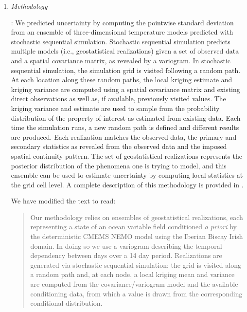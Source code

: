 \documentclass[a4paper]{article}
\begin{document}
\begin{answers}
\begin{enumerate}
\begin{quote}
\end{quote}

\item {\it Methodology}\label{sec:r1-meth}


  \action: We predicted uncertainty by computing the pointwise
  standard deviation from an ensemble of three-dimensional temperature
  models predicted with stochastic sequential simulation. Stochastic
  sequential simulation predicts multiple models (i.e., geostatistical
  realizations) given a set of observed data and a spatial covariance
  matrix, as revealed by a variogram.  In stochastic sequential
  simulation, the simulation grid is visited following a random
  path. At each location along these random paths, the local kriging
  estimate and kriging variance are computed using a spatial
  covariance matrix and existing direct observations as well as, if
  available, previously visited values. The kriging variance and
  estimate are used to sample from the probability distribution of the
  property of interest as estimated from existing data. Each time the
  simulation runs, a new random path is defined and different results
  are produced. Each realization matches the observed data, the
  primary and secondary statistics as revealed from the observed data
  and the imposed spatial continuity pattern.  The set of
  geostatistical realizations represents the posterior distribution of
  the phenomena one is trying to model, and this ensemble can be used
  to estimate uncertainty by computing local statistics at the grid
  cell level. A complete description of this methodology is provided
  in \cite{duarte2025}.

  We have modified the text to read:

\begin{quote}

  Our methodology relies on ensembles of geostatistical realizations,
  each representing a state of an ocean variable field conditioned
  \emph{a priori} by the deterministic CMEMS NEMO model
  \cite{madec97,madec15,CMEMS_IBI_MFC} using the Iberian Biscay Irish
  domain. In doing so we use a variogram describing the temporal
  dependency between days over a 14 day period. Realizations are
  generated via stochastic sequential simulation: the grid is visited
  along a random path and, at each node, a local kriging mean and
  variance are computed from the covariance/variogram model and the
  available conditioning data, from which a value is drawn from the
  corresponding conditional distribution.
\end{quote}


\end{enumerate}
\end{answers}
\end{document}

